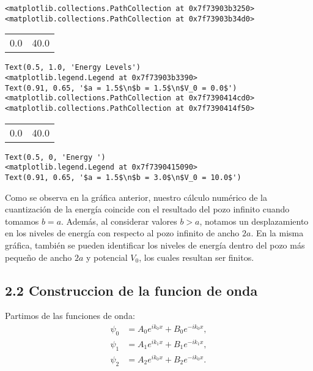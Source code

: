 \documentclass[11pt]{article}
\begin{document}
\label{org66d845c}
\begin{verbatim}
<matplotlib.collections.PathCollection at 0x7f73903b3250>
<matplotlib.collections.PathCollection at 0x7f73903b34d0>
\end{verbatim}

\begin{center}
\begin{tabular}{rr}
0.0 & 40.0\\
\end{tabular}
\end{center}
\begin{verbatim}
Text(0.5, 1.0, 'Energy Levels')
<matplotlib.legend.Legend at 0x7f73903b3390>
Text(0.91, 0.65, '$a = 1.5$\n$b = 1.5$\n$V_0 = 0.0$')
<matplotlib.collections.PathCollection at 0x7f7390414cd0>
<matplotlib.collections.PathCollection at 0x7f7390414f50>
\end{verbatim}

\begin{center}
\begin{tabular}{rr}
0.0 & 40.0\\
\end{tabular}
\end{center}
\begin{verbatim}
Text(0.5, 0, 'Energy ')
<matplotlib.legend.Legend at 0x7f7390415090>
Text(0.91, 0.65, '$a = 1.5$\n$b = 3.0$\n$V_0 = 10.0$')
\end{verbatim}

\begin{center}

\end{center}

Como se observa en la gráfica anterior, nuestro cálculo numérico de la
cuantización de la energía coincide con el resultado del pozo infinito
cuando tomamos \(b = a\). Además, al considerar valores \(b > a\), notamos
un desplazamiento en los niveles de energía con respecto al pozo
infinito de ancho \(2a\). En la misma gráfica, también se pueden
identificar los niveles de energía dentro del pozo más pequeño de ancho
\(2a\) y potencial \(V_0\), los cuales resultan ser finitos.
\subsection{\textbf{2.2 Construccion de la funcion de onda}}
\label{sec:org0106a10}
Partimos de las funciones de onda:
\begin{align*}
\psi_0 & = A_0e^{i k_0x} + B_0e^{-i k_0x}, \\
\psi_1 & = A_1e^{i k_1x} + B_1e^{-i k_1x}, \\
\psi_2 & = A_2e^{i k_0x} + B_2e^{-i k_0x}.
\end{align*}
\end{document}
